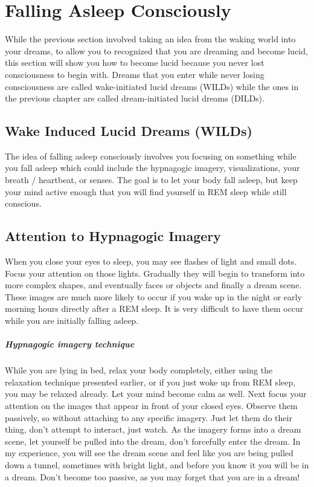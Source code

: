 \documentclass{book}
\begin{document}
\chapter{Falling Asleep Consciously}
While the previous section involved taking an idea from the waking world into your dreams, to allow you to recognized that you are dreaming and become lucid, this section will show you how to become lucid because you never lost consciousness to begin with. Dreams that you enter while never losing consciousness are called wake-initiated lucid dreams (WILDs) while the ones in the previous chapter are called dream-initiated lucid dreams (DILDs).

\section{Wake Induced Lucid Dreams (WILDs)}
The idea of falling asleep consciously involves you focusing on something while you fall asleep which could include the hypnagogic imagery, visualizations, your breath / heartbeat, or senses. The goal is to let your body fall asleep, but keep your mind active enough that you will find yourself in REM sleep while still conscious.

\section{Attention to Hypnagogic Imagery}
When you close your eyes to sleep, you may see flashes of light and small dots. Focus your attention on those lights. Gradually they will begin to transform into more complex shapes, and eventually faces or objects and finally a dream scene. These images are much more likely to occur if you wake up in the night or early morning hours directly after a REM sleep. It is very difficult to have them occur while you are initially falling asleep.

\paragraph{Hypnagogic imagery technique} While you are lying in bed, relax your body completely, either using the relaxation technique presented earlier, or if you just woke up from REM sleep, you may be relaxed already. Let your mind become calm as well. Next focus your attention on the images that appear in front of your closed eyes. Observe them passively, so without attaching to any specific imagery. Just let them do their thing, don't attempt to interact, just watch. As the imagery forms into a dream scene, let yourself be pulled into the dream, don't forcefully enter the dream. In my experience, you will see the dream scene and feel like you are being pulled down a tunnel, sometimes with bright light, and before you know it you will be in a dream. Don't become too passive, as you may forget that you are in a dream!
\end{document}
